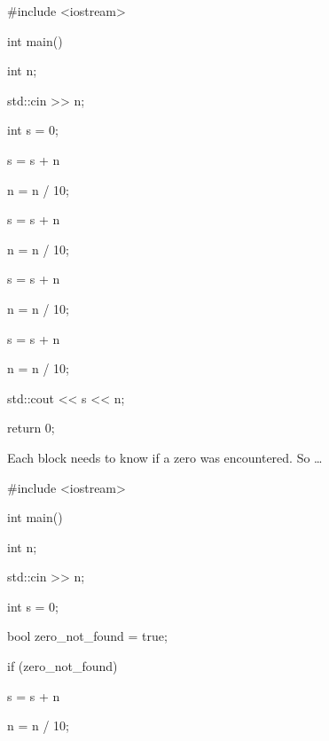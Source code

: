 \begin{console}

#include <iostream>



int main()

{

    int n;

    std::cin >> n;



    int s = 0;



    s = s + n %



    n = n / 10;



    s = s + n %



    n = n / 10;



    s = s + n %



    n = n / 10;



    s = s + n %



    n = n / 10;



    std::cout << s << n;



    return 0;

} 





Each block needs to know if a zero was encountered. So \ldots



\begin{console}

#include <iostream>



int main()

{

    int n;

    std::cin >> n;



    int s = 0;

    bool zero_not_found = true;



    if (zero_not_found)

    {

        s = s + n %

        n = n / 10;

}}
\end{console}
\end{console}
